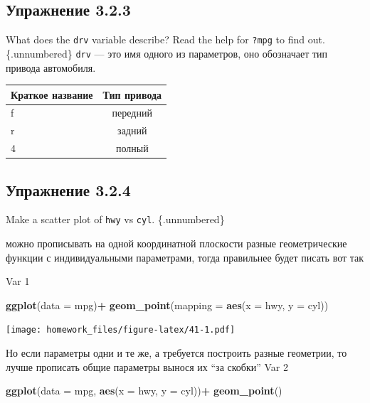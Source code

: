 \documentclass[]{book}
\newenvironment{Shaded}{\begin{snugshade}}{\end{snugshade}}
\newcommand{\KeywordTok}[1]{\textcolor[rgb]{0.13,0.29,0.53}{\textbf{#1}}}
\newcommand{\DataTypeTok}[1]{\textcolor[rgb]{0.13,0.29,0.53}{#1}}
\newcommand{\StringTok}[1]{\textcolor[rgb]{0.31,0.60,0.02}{#1}}
\newcommand{\OperatorTok}[1]{\textcolor[rgb]{0.81,0.36,0.00}{\textbf{#1}}}
\newcommand{\NormalTok}[1]{#1}
\begin{document}
\subsection*{Упражнение 3.2.3}\label{-3.2.3}

What does the \texttt{drv} variable describe? Read the help for
\texttt{?mpg} to find out. \{.unnumbered\} \texttt{drv} --- это имя
одного из параметров, оно обозначает тип привода автомобиля.

\begin{longtable}[]{@{}lc@{}}
\toprule
Краткое название & Тип привода\tabularnewline
\midrule
\endhead
f & передний\tabularnewline
r & задний\tabularnewline
4 & полный\tabularnewline
\bottomrule
\end{longtable}

\subsection*{Упражнение 3.2.4}\label{-3.2.4}

Make a scatter plot of \texttt{hwy} vs \texttt{cyl}. \{.unnumbered\}

можно прописывать на одной координатной плоскости разные геометрические
функции с индивидуальными параметрами, тогда правильнее будет писать вот
так

Var 1

\begin{Shaded}
\begin{Highlighting}[]
\KeywordTok{ggplot}\NormalTok{(}\DataTypeTok{data =}\NormalTok{ mpg)}\OperatorTok{+}
\StringTok{  }\KeywordTok{geom_point}\NormalTok{(}\DataTypeTok{mapping =} \KeywordTok{aes}\NormalTok{(}\DataTypeTok{x =}\NormalTok{ hwy, }\DataTypeTok{y =}\NormalTok{ cyl))}
\end{Highlighting}
\end{Shaded}

\texttt{[image: homework\_files/figure-latex/41-1.pdf]}

Но если параметры одни и те же, а требуется построить разные геометрии,
то лучше прописать общие параметры вынося их ``за скобки'' Var 2

\begin{Shaded}
\begin{Highlighting}[]
\KeywordTok{ggplot}\NormalTok{(}\DataTypeTok{data =}\NormalTok{ mpg, }\KeywordTok{aes}\NormalTok{(}\DataTypeTok{x =}\NormalTok{ hwy, }\DataTypeTok{y =}\NormalTok{ cyl))}\OperatorTok{+}
\StringTok{ }\KeywordTok{geom_point}\NormalTok{()}
\end{Highlighting}
\end{Shaded}
\end{document}
